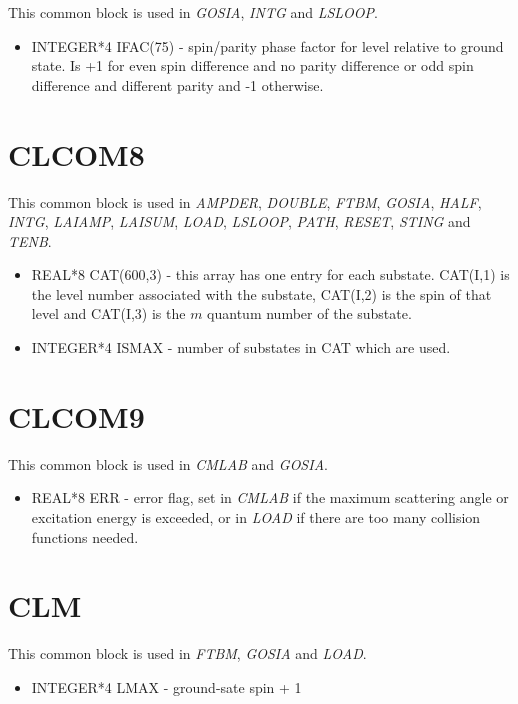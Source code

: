 This common block is used in \emph{GOSIA}, \emph{INTG} and \emph{LSLOOP}.

\begin{itemize}
\item INTEGER*4 IFAC(75) - spin/parity phase factor for level relative to
ground state. Is +1 for even spin difference and no parity difference or odd
spin difference and different parity and -1 otherwise.
\end{itemize}

\section{CLCOM8}

This common block is used in \emph{AMPDER}, \emph{DOUBLE}, \emph{FTBM}, \emph{
GOSIA}, \emph{HALF}, \emph{INTG}, \emph{LAIAMP}, \emph{LAISUM}, \emph{LOAD}, \emph{
LSLOOP}, \emph{PATH}, \emph{RESET}, \emph{STING} and \emph{TENB}.

\begin{itemize}
\item REAL*8 CAT(600,3) - this array has one entry for each substate.
CAT(I,1) is the level number associated with the substate, CAT(I,2) is the
spin of that level and CAT(I,3) is the $m$ quantum number of the substate.
\item INTEGER*4 ISMAX - number of substates in CAT which are used.
\end{itemize}

\section{CLCOM9}

This common block is used in \emph{CMLAB} and \emph{GOSIA}.

\begin{itemize}
\item REAL*8 ERR - error flag, set in \emph{CMLAB} if the maximum scattering
angle or excitation energy is exceeded, or in \emph{LOAD} if there are too
many collision functions needed.
\end{itemize}

\section{CLM}

This common block is used in \emph{FTBM}, \emph{GOSIA} and \emph{LOAD}.

\begin{itemize}
\item INTEGER*4 LMAX - ground-sate spin + 1
\end{itemize}

